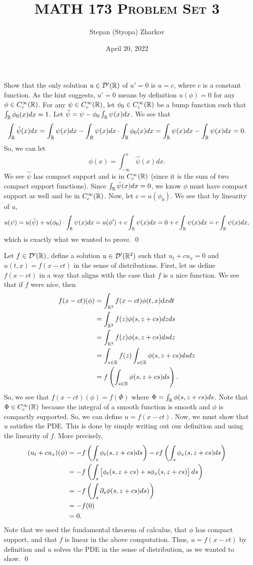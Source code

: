 \documentclass{article}
\title{\textsc{MATH 173 Problem Set 3}}
\author{Stepan (Styopa) Zharkov}
\date{April 20, 2022}
\newcommand{\Cc}{{C_c^\infty(\RR)}}
\renewcommand{\d}{\partial}
\begin{document}
\maketitle
{}Show that the only solution $u \in \mathcal{D}'(\mathbb{R})$ of $u' = 0$ is $u = c$, where $c$ is a constant function. \tri
\hop
\solution
As the hint suggests, $u' = 0$ means by definition $u(\phi) = 0$ for any $\phi \in C_c^\infty(\mathbb{R})$. For any $\psi \in \Cc$, let $\phi_0\in \Cc$ be a bump function such that $\int_{\mathbb{R}} \phi_0(x)dx = 1$. Let $\hat{\psi} = \psi - \phi_0\int_{\mathbb{R}}\psi(x)dx$. We see that 
\[\int_{\mathbb{R}} \hat{\psi}(x)dx = \int_{\mathbb{R}} \psi(x)dx -\int_R\psi(x)dx\cdot \int_{\mathbb{R}}\phi_0(x)dx =\int_{\mathbb{R}} \psi(x)dx-\int_{\mathbb{R}} \psi(x)dx = 0.\]
So, we can let 
\[\phi(x) = \int_{-\infty}^x \hat{\psi}(x) dx.\]
We see $\hat{\psi}$ has compact support and is in $\Cc$ (since it is the sum of two compact support functions). Since $\int_{\mathbb{R}} \hat{\psi}(x)dx = 0$, we know $\phi$ must have compact support as well and be in $\Cc$. Now, let $c = u(\phi_0)$. We see that by linearity of $u$,
\[u(\psi) = u(\hat{\psi}) + u(\phi_0)\cdot \int_{\mathbb{R}}\psi(x)dx = u(\phi') + c\int_{\mathbb{R}}\psi(x)dx =0+  c\int_{\mathbb{R}}\psi(x)dx=c\int_{\mathbb{R}}\psi(x)dx, \]
which is exactly what we wanted to prove. 
\qed


\newpage
{} Let $f \in \mathcal{D}'(\mathbb{R})$, define a solution $u \in \mathcal{D}'(\mathbb{R}^2)$ such that $u_t +cu_x = 0$ and $u(t,x) = f(x-ct)$ in the sense of distributions.
\tri
\hop
\solution
First, let us define $f(x-ct)$ in a way that aligns with the case that $f$ is a nice function. We see that if $f$ were nice, then
\begin{align*}
    f(x-ct)(\phi)&= \int_{\RR^2}f(x-ct)\phi(t,x)dxdt \\
    &= \int_{\RR^2}f(z)\phi(s,z+cs)dzds \\
    &= \int_{\RR^2}f(z)\phi(s,z+cs)dsdz \\
    & = \int_{z \in \RR} f(z) \int_{s \in \RR} \phi(s,z+cs)ds dz\\
    &= f\del{\int_{s \in \RR}\phi(s,z+cs)ds}. 
\end{align*}
So, we see that $f(x-ct)(\phi) = f(\Phi)$ where $\Phi = \int_{\mathbb{R}} \phi(s,z+cs)ds$. Note that $\Phi \in \Cc$ because the integral of a smooth function is smooth and $\phi$ is compactly supported. So, we can define $u = f(x-ct)$. 
\hop 
Now, we must show that $u$ satisfies the PDE. This is done by simply writing out our definition and using the linearity of $f$. More precisely, 
\begin{align*}
    (u_t + cu_x)(\phi) &= -f\del{\int_s \phi_t(s, z +cs) ds} -cf\del{\int_s \phi_x(s, z +cs) ds} \\
    &= -f\del{\int_s \sbr{\phi_t(s, z +cs) +s\phi_x(s, z +cs)} ds} \\
    & = -f\del{\int_s\d_s \phi(s,z+cs) ds)}\\
    &= -f(0) \\
    &= 0.
\end{align*} 
Note that we used the fundamental theorem of calculus, that $\phi$ has compact support, and that $f$ is linear in the above computation. 
\hop 
Thus, $u = f(x-ct)$ by definition and $u$ solves the PDE in the sense of distribution, as we wanted to show.
\qed
\end{document}
